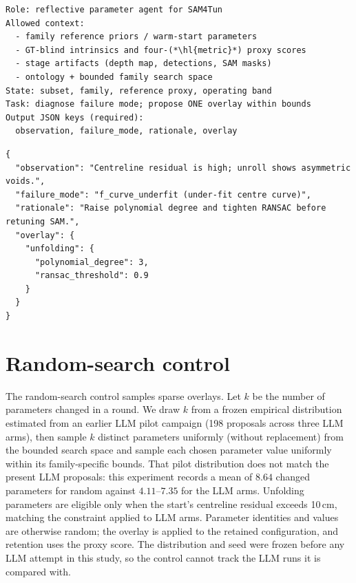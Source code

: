 \documentclass[a4paper,fleqn]{cas-dc}
\let\texthl\hl
\renewcommand{\hl}[1]{\ifmmode\colorbox{yellow}{\ensuremath{#1}}\else\texthl{#1}\fi}
\begin{document}
\begin{lstlisting}[caption={Agent-prompt skeleton (per round).},label=lst:prompt-skeleton]
Role: reflective parameter agent for SAM4Tun
Allowed context:
  - family reference priors / warm-start parameters
  - GT-blind intrinsics and four-(*\hl{metric}*) proxy scores
  - stage artifacts (depth map, detections, SAM masks)
  - ontology + bounded family search space
State: subset, family, reference proxy, operating band
Task: diagnose failure mode; propose ONE overlay within bounds
Output JSON keys (required):
  observation, failure_mode, rationale, overlay
\end{lstlisting}

\begin{lstlisting}[caption={Example JSON proposal returned by the agent.},label=lst:prompt-example]
{
  "observation": "Centreline residual is high; unroll shows asymmetric voids.",
  "failure_mode": "f_curve_underfit (under-fit centre curve)",
  "rationale": "Raise polynomial degree and tighten RANSAC before retuning SAM.",
  "overlay": {
    "unfolding": {
      "polynomial_degree": 3,
      "ransac_threshold": 0.9
    }
  }
}
\end{lstlisting}

\section{Random-search control}\label{app:random-search}

The random-search control samples sparse overlays. Let $k$ be the number of parameters changed in a round. We draw $k$ from a frozen empirical distribution estimated from an earlier LLM pilot campaign (198 proposals across three LLM arms), then sample $k$ distinct parameters uniformly (without replacement) from the bounded search space and sample each chosen parameter value uniformly within its family-specific bounds. That pilot distribution does not match the present LLM proposals: this experiment records a mean of $8.64$ changed parameters for random against $4.11$--$7.35$ for the LLM arms. Unfolding parameters are eligible only when the start's centreline residual exceeds 10\,cm, matching the constraint applied to LLM arms. Parameter identities and values are otherwise random; the overlay is applied to the retained configuration, and retention uses the proxy score. The distribution and seed were frozen before any LLM attempt in this study, so the control cannot track the LLM runs it is compared with.
\end{document}
